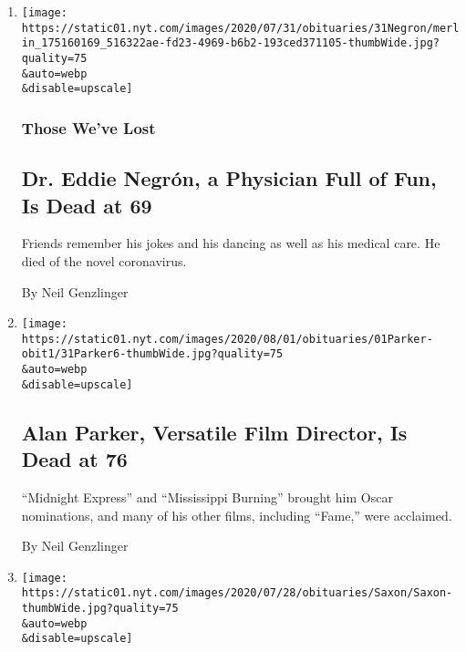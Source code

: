\begin{enumerate}
\def\labelenumi{\arabic{enumi}.}
\item
  \href{/2020/08/01/obituaries/eddie-negron-dead-coronavirus.html}{}

  \texttt{[image: https://static01.nyt.com/images/2020/07/31/obituaries/31Negron/merlin\_175160169\_516322ae-fd23-4969-b6b2-193ced371105-thumbWide.jpg?quality=75\\\&auto=webp\\\&disable=upscale]}

  \hypertarget{those-weve-lost}{%
  \subsubsection{Those We've Lost}\label{those-weve-lost}}

  \hypertarget{dr-eddie-negruxf3n-a-physician-full-of-fun-is-dead-at-69}{%
  \subsection{Dr. Eddie Negrón, a Physician Full of Fun, Is Dead at
  69}\label{dr-eddie-negruxf3n-a-physician-full-of-fun-is-dead-at-69}}

  Friends remember his jokes and his dancing as well as his medical
  care. He died of the novel coronavirus.

  By Neil Genzlinger
\item
  \href{/2020/07/31/movies/alan-parker-versatile-film-director-is-dead-at-76.html}{}

  \texttt{[image: https://static01.nyt.com/images/2020/08/01/obituaries/01Parker-obit1/31Parker6-thumbWide.jpg?quality=75\\\&auto=webp\\\&disable=upscale]}

  \hypertarget{alan-parker-versatile-film-director-is-dead-at-76}{%
  \subsection{Alan Parker, Versatile Film Director, Is Dead at
  76}\label{alan-parker-versatile-film-director-is-dead-at-76}}

  ``Midnight Express'' and ``Mississippi Burning'' brought him Oscar
  nominations, and many of his other films, including ``Fame,'' were
  acclaimed.

  By Neil Genzlinger
\item
  \href{/2020/07/28/arts/television/john-saxon-dead.html}{}

  \texttt{[image: https://static01.nyt.com/images/2020/07/28/obituaries/Saxon/Saxon-thumbWide.jpg?quality=75\\\&auto=webp\\\&disable=upscale]}


\end{enumerate}
